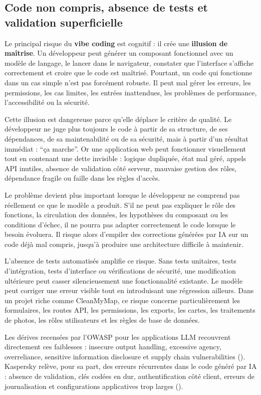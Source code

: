 \documentclass[
  10pt,
  a4paper,
  DIV=11,
  numbers=noendperiod,
  oneside]{scrreprt}
\let\oldtextbf\textbf
\renewcommand{\textbf}[1]{\oldtextbf{\textcolor{cmmnavy}{#1}}}
\begin{document}
\subsection{Code non compris, absence de tests et validation
superficielle}\label{code-non-compris-absence-de-tests-et-validation-superficielle}

Le principal risque du \textbf{vibe coding} est cognitif : il crée une
\textbf{illusion de maîtrise}. Un développeur peut générer un composant
fonctionnel avec un modèle de langage, le lancer dans le navigateur,
constater que l'interface s'affiche correctement et croire que le code
est maîtrisé. Pourtant, un code qui fonctionne dans un cas simple n'est
pas forcément robuste. Il peut mal gérer les erreurs, les permissions,
les cas limites, les entrées inattendues, les problèmes de performance,
l'accessibilité ou la sécurité.

Cette illusion est dangereuse parce qu'elle déplace le critère de
qualité. Le développeur ne juge plus toujours le code à partir de sa
structure, de ses dépendances, de sa maintenabilité ou de sa sécurité,
mais à partir d'un résultat immédiat : ``ça marche''. Or une application
web peut fonctionner visuellement tout en contenant une dette invisible
: logique dupliquée, état mal géré, appels API inutiles, absence de
validation côté serveur, mauvaise gestion des rôles, dépendance fragile
ou faille dans les règles d'accès.

Le problème devient plus important lorsque le développeur ne comprend
pas réellement ce que le modèle a produit. S'il ne peut pas expliquer le
rôle des fonctions, la circulation des données, les hypothèses du
composant ou les conditions d'échec, il ne pourra pas adapter
correctement le code lorsque le besoin évoluera. Il risque alors
d'empiler des corrections générées par IA sur un code déjà mal compris,
jusqu'à produire une architecture difficile à maintenir.

L'absence de tests automatisés amplifie ce risque. Sans tests unitaires,
tests d'intégration, tests d'interface ou vérifications de sécurité, une
modification ultérieure peut casser silencieusement une fonctionnalité
existante. Le modèle peut corriger une erreur visible tout en
introduisant une régression ailleurs. Dans un projet riche comme
CleanMyMap, ce risque concerne particulièrement les formulaires, les
routes API, les permissions, les exports, les cartes, les traitements de
photos, les rôles utilisateurs et les règles de base de données.

Les dérives recensées par l'OWASP pour les applications LLM recouvrent
directement ces faiblesses : insecure output handling, excessive agency,
overreliance, sensitive information disclosure et supply chain
vulnerabilities ().
Kaspersky relève, pour sa part, des erreurs récurrentes dans le code
généré par IA : absence de validation, clés codées en dur,
authentification côté client, erreurs de journalisation et
configurations applicatives trop larges
().
\end{document}
